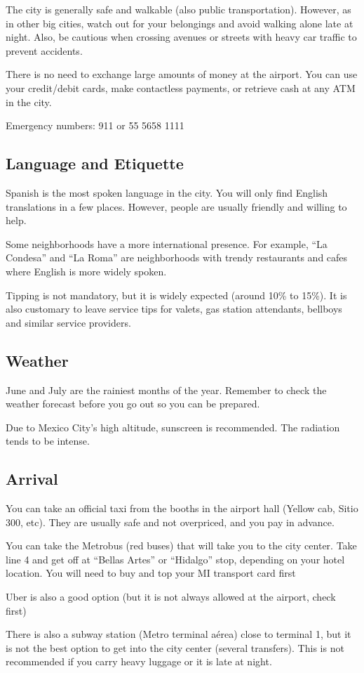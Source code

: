 The city is generally safe and walkable (also public transportation). However, as in other big cities, watch out for your belongings and avoid walking alone late at night. Also, be cautious when crossing avenues or streets with heavy car traffic to prevent accidents.

There is no need to exchange large amounts of money at the airport. You can use your credit/debit cards, make contactless payments, or retrieve cash at any ATM in the city.


Emergency numbers: 911  or  55 5658 1111

\subsection*{Language and Etiquette}
Spanish is the most spoken language in the city. You will only find English translations in a few places.  However, people are usually friendly and willing to help.

Some neighborhoods have a more international presence. For example, ``La Condesa'' and ``La Roma'' are neighborhoods with trendy restaurants and cafes where English is more widely spoken.

Tipping is not mandatory, but it is widely expected (around 10\% to 15\%).  It is  also customary to leave service tips for valets, gas station attendants, bellboys and similar service providers.

\subsection*{Weather}

June and July are the rainiest months of the year. Remember to check the weather forecast before you go out so you can be prepared.

Due to Mexico City's high altitude, sunscreen is recommended. The radiation tends to be intense.

\subsection*{Arrival}

You can take an official taxi from the booths in the airport hall (Yellow cab, Sitio 300, etc). They are usually safe and not overpriced, and you pay in advance.

You can take the Metrobus (red buses) that will take you to the city center. Take line 4 and get off at ``Bellas Artes'' or ``Hidalgo'' stop, depending on your hotel location. You will need to buy and top your MI transport card first

Uber is also a good option (but it is not always allowed at the airport, check first)

There is also a subway station (Metro terminal a\'erea) close to terminal 1, but it is not the best option to get into the city center (several transfers). This is not recommended if you carry heavy luggage or it is late at night.



